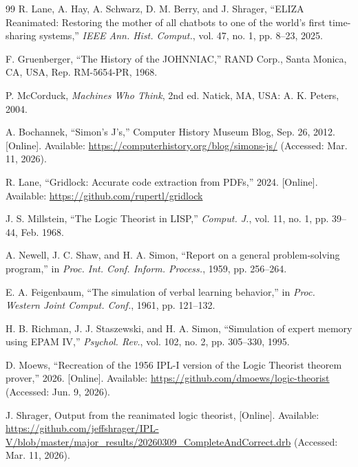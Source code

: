\documentclass[journal]{IEEEtran}
\begin{document}
\begin{thebibliography}{99}
 R. Lane, A. Hay, A. Schwarz, D. M. Berry, and
  J. Shrager, ``ELIZA Reanimated: Restoring the mother of all chatbots
  to one of the world's first time-sharing systems,'' \textit{IEEE
    Ann. Hist. Comput.}, vol. 47, no. 1, pp. 8--23, 2025.

 F. Gruenberger, ``The History of the
  JOHNNIAC,'' RAND Corp., Santa Monica, CA, USA, Rep. RM-5654-PR,
  1968.

 P. McCorduck, \textit{Machines Who
  Think}, 2nd ed. Natick, MA, USA: A. K. Peters, 2004.

 A. Bochannek, ``Simon's J's,''
  Computer History Museum Blog, Sep. 26, 2012. [Online]. Available:
  \url{https://computerhistory.org/blog/simons-js/} (Accessed:
  Mar. 11, 2026).

 R. Lane, ``Gridlock: Accurate code
  extraction from PDFs,'' 2024. [Online]. Available:
  \url{https://github.com/rupertl/gridlock}

 J. S. Millstein, ``The Logic Theorist in
  LISP,'' \textit{Comput. J.}, vol. 11, no. 1, pp. 39--44, Feb. 1968.

 A. Newell, J. C. Shaw, and H. A. Simon,
  ``Report on a general problem-solving program,'' in
  \textit{Proc. Int. Conf. Inform. Process.}, 1959, pp. 256--264.

 E. A. Feigenbaum, ``The simulation of
  verbal learning behavior,'' in \textit{Proc. Western Joint
    Comput. Conf.}, 1961, pp. 121--132.

 H. B. Richman, J. J. Staszewski, and
  H. A. Simon, ``Simulation of expert memory using EPAM IV,''
  \textit{Psychol. Rev.}, vol. 102, no. 2, pp. 305--330, 1995.

 D. Moews, ``Recreation of the 1956 IPL-I version
  of the Logic Theorist theorem prover,'' 2026. [Online]. Available:
  \url{https://github.com/dmoews/logic-theorist} (Accessed: Jun. 9,
  2026).

 J. Shrager, Output from the reanimated logic
  theorist, [Online]. Available:
  \url{https://github.com/jeffshrager/IPL-V/blob/master/major_results/20260309_CompleteAndCorrect.drb}
  (Accessed: Mar. 11, 2026).

\end{thebibliography}

\clearpage %
\onecolumn %
\end{document}
